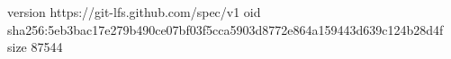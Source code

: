 version https://git-lfs.github.com/spec/v1
oid sha256:5eb3bac17e279b490ce07bf03f5cca5903d8772e864a159443d639c124b28d4f
size 87544
